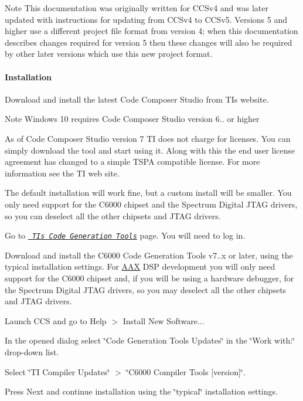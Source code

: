 \begin{DoxyNote}{Note}
This documentation was originally written for C\+C\+Sv4 and was later updated with instructions for updating from C\+C\+Sv4 to C\+C\+Sv5. Versions 5 and higher use a different project file format from version 4; when this documentation describes changes required for version 5 then these changes will also be required by other later versions which use this new project format.
\end{DoxyNote}
\hypertarget{a00832_subsubsection__installation_}{}\paragraph{Installation}\label{a00832_subsubsection__installation_}

\begin{DoxyEnumerate}
\item Download and install the latest Code Composer Studio from TI\textquotesingle{}s website.

\begin{DoxyNote}{Note}
Windows 10 requires Code Composer Studio version 6.. or higher

As of Code Composer Studio version 7 TI does not charge for licenses. You can simply download the tool and start using it. Along with this the end user license agreement has changed to a simple T\+S\+PA compatible license. For more information see the TI web site.  
\end{DoxyNote}

\item The default installation will work fine, but a custom install will be smaller. You only need support for the C6000 chipset and the Spectrum Digital J\+T\+AG drivers, so you can deselect all the other chipsets and J\+T\+AG drivers.  
\item Go to{\itshape  } {\itshape  \href{https://www-a.ti.com/downloads/sds_support/TICodegenerationTools/download.htm}{\texttt{ TI\textquotesingle{}s Code Generation Tools}}} {\itshape  } page. You will need to log in. 
\item Download and install the C6000 Code Generation Tools v7..\+x or later, using the typical installation settings. For \mbox{\hyperlink{a00852}{A\+AX}} D\+SP development you will only need support for the C6000 chipset and, if you will be using a hardware debugger, for the Spectrum Digital J\+T\+AG drivers, so you may deselect all the other chipsets and J\+T\+AG drivers.


\begin{DoxyEnumerate}
\item Launch C\+CS and go to Help $>$ Install New Software...  
\item In the opened dialog select \char`\"{}\+Code Generation Tools Updates\char`\"{} in the \char`\"{}\+Work with\+:\char`\"{} drop-\/down list.  
\item Select \char`\"{}\+T\+I Compiler Updates\char`\"{} $>$ \char`\"{}\+C6000 Compiler Tools \mbox{[}version\mbox{]}\char`\"{}.  
\item Press Next and continue installation using the \char`\"{}typical\char`\"{} installation settings. 
\end{DoxyEnumerate}


\end{DoxyEnumerate}
